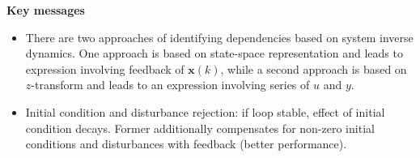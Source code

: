 






\textbf{Key messages}
\begin{itemize}
\color{grey1}
\item There are two approaches of identifying dependencies based on system inverse dynamics. One approach is based on state-space representation and leads to expression involving feedback of $\mathbf{x}(k)$, while a second approach is based on $z$-transform and leads to an expression involving series of $u$ and $y$.
\item Initial condition and disturbance rejection: if loop stable, effect of initial condition decays. Former additionally compensates for non-zero initial conditions and disturbances with feedback (better performance).
\end{itemize}


